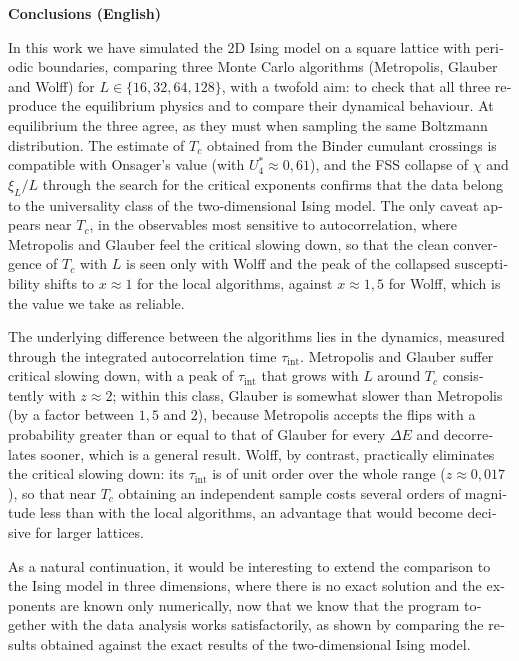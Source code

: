 \newpage
\clearpage
\begin{otherlanguage}{english}
\noindent\textbf{\large Conclusions (English)}
\vspace{0.5em}

In this work we have simulated the 2D Ising model on a square lattice with periodic boundaries, comparing three Monte Carlo algorithms (Metropolis, Glauber and Wolff) for $L\in\{16,32,64,128\}$, with a twofold aim: to check that all three reproduce the equilibrium physics and to compare their dynamical behaviour. At equilibrium the three agree, as they must when sampling the same Boltzmann distribution. The estimate of $T_c$ obtained from the Binder cumulant crossings is compatible with Onsager's value (with $U_4^*\approx 0{,}61$), and the FSS collapse of $\chi$ and $\xi_L/L$ through the search for the critical exponents confirms that the data belong to the universality class of the two-dimensional Ising model. The only caveat appears near $T_c$, in the observables most sensitive to autocorrelation, where Metropolis and Glauber feel the critical slowing down, so that the clean convergence of $T_c$ with $L$ is seen only with Wolff and the peak of the collapsed susceptibility shifts to $x\approx 1$ for the local algorithms, against $x\approx 1{,}5$ for Wolff, which is the value we take as reliable.

The underlying difference between the algorithms lies in the dynamics, measured through the integrated autocorrelation time $\tau_{\text{int}}$. Metropolis and Glauber suffer critical slowing down, with a peak of $\tau_{\text{int}}$ that grows with $L$ around $T_c$ consistently with $z\approx 2$; within this class, Glauber is somewhat slower than Metropolis (by a factor between $1{,}5$ and $2$), because Metropolis accepts the flips with a probability greater than or equal to that of Glauber for every $\Delta E$ and decorrelates sooner, which is a general result. Wolff, by contrast, practically eliminates the critical slowing down: its $\tau_{\text{int}}$ is of unit order over the whole range ($z\approx 0{,}017$), so that near $T_c$ obtaining an independent sample costs several orders of magnitude less than with the local algorithms, an advantage that would become decisive for larger lattices.

As a natural continuation, it would be interesting to extend the comparison to the Ising model in three dimensions, where there is no exact solution and the exponents are known only numerically, now that we know that the program together with the data analysis works satisfactorily, as shown by comparing the results obtained against the exact results of the two-dimensional Ising model.
\end{otherlanguage}